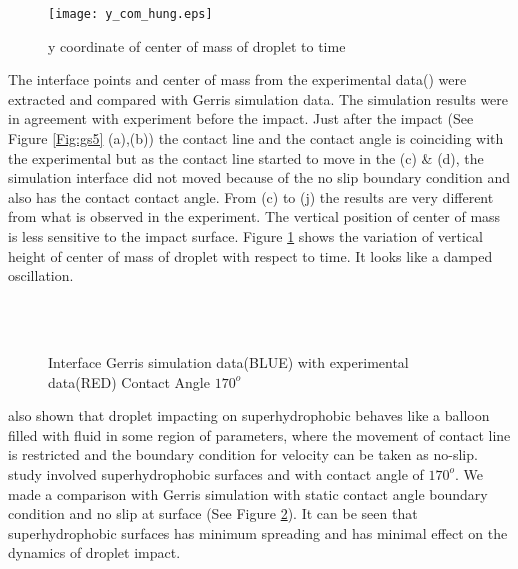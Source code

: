 \begin{figure}[H]
 \texttt{[image: y\_com\_hung.eps]}
 \caption{y coordinate of center of mass of droplet to time}
 \label{Fig:y_com}
\end{figure}

The interface points and center of mass from the experimental data(\cite{Hung2011}) were extracted and compared with Gerris simulation data. 
The simulation results were in agreement with experiment before the impact. Just after the impact (See Figure \ref{Fig:gs5} (a),(b)) the contact line and the contact angle is coinciding with 
the experimental but as the contact line started to move in the (c) \& (d), the simulation interface did not moved because of the no slip boundary condition and also has the contact 
contact angle. From (c) to (j) the results are very different from what is observed in the experiment. The vertical position of center of mass is less sensitive to the impact surface.
Figure \ref{Fig:y_com} shows the variation of vertical height of center of mass of droplet with respect to time. It looks like a damped oscillation.  

\begin{figure}[H]
 \centering
       \\
       \\
 \caption{Interface Gerris simulation data(BLUE) with \cite{Clanet2004} experimental data(RED) Contact Angle $170^o$}
 \label{Fig:gs6}
 \end{figure}
 \cite{Clanet2004}  also shown that droplet impacting on superhydrophobic behaves like a balloon filled with fluid in some region of parameters,
 where the movement of contact line is restricted and the boundary condition for velocity can be taken as no-slip. 
 \cite{Clanet2004} study involved superhydrophobic surfaces and with contact angle of  $170^o$. We made a comparison with Gerris simulation with static contact angle
 boundary condition and no slip  at surface (See Figure \ref{Fig:gs6}). It can be seen that superhydrophobic surfaces has minimum spreading and has minimal effect on 
 the dynamics of droplet impact.
 
